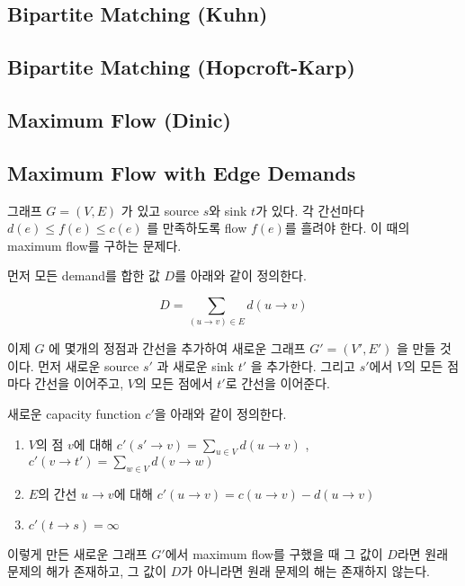 \documentclass[9pt,landscape,a4paper,twocolumn]{extarticle}
\begin{document}
\subsection{Bipartite Matching (Kuhn)}


\subsection{Bipartite Matching (Hopcroft-Karp)}


\subsection{Maximum Flow (Dinic)}


\subsection{Maximum Flow with Edge Demands}

그래프 $G=(V,E)$ 가 있고 source $s$와 sink $t$가 있다. 각 간선마다 $d(e) \leq f(e) \leq c(e)$ 를 만족하도록 flow $f(e)$를 흘려야 한다. 이 때의 maximum flow를 구하는 문제다.

먼저 모든 demand를 합한 값 $D$를 아래와 같이 정의한다.

\begin{displaymath}
D = \sum_{(u \to v) \in E} d(u \to v)
\end{displaymath}

이제 $G$ 에 몇개의 정점과 간선을 추가하여 새로운 그래프 $G'=(V',E')$ 을 만들 것이다. 먼저 새로운 source $s'$ 과 새로운 sink $t'$ 을 추가한다. 그리고 $s'$에서 $V$의 모든 점마다 간선을 이어주고, $V$의 모든 점에서 $t'$로 간선을 이어준다.

새로운 capacity function $c'$을 아래와 같이 정의한다.

\begin{enumerate}
\item $V$의 점 $v$에 대해 $c'(s' \to v) = \sum_{u \in V} d(u \to v)$ , $c'(v \to t') = \sum_{w \in V} d(v \to w)$
\item $E$의 간선 $u \to v$에 대해 $c'(u \to v) = c(u \to v) - d(u \to v)$
\item $c'(t \to s) = \infty$
\end{enumerate}

이렇게 만든 새로운 그래프 $G'$에서 maximum flow를 구했을 때 그 값이 $D$라면 원래 문제의 해가 존재하고, 그 값이 $D$가 아니라면 원래 문제의 해는 존재하지 않는다.
\end{document}
